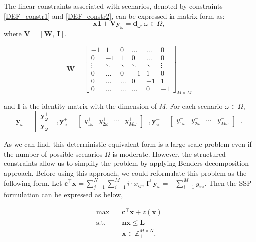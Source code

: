 The linear constraints associated with scenarios, denoted by constraints \eqref{DEF_constr1} and \eqref{DEF_constr2}, can be expressed in matrix form as:
\[\mathbf{x} \mathbf{1} + \mathbf{V} \mathbf{y}_\omega = \mathbf{d}_\omega, \omega\in \Omega,\]
where $\mathbf{V} = [\mathbf{W}, ~\mathbf{I}]$.

$$
\mathbf{W}=\left[\begin{array}{cccccc}
-1 & 1 & 0 & \ldots & \ldots & 0 \\
0 & -1 & 1 &    0   & \ldots & 0 \\
\vdots & \ddots & \ddots & \ddots & \ddots & \vdots \\
0  & \ldots   &  0  & -1 & 1 & 0 \\
0  & \ldots   &  \ldots  &  0 &  -1 & 1 \\
0 & \ldots & \ldots & \ldots & 0 & -1
\end{array}\right]_{M \times M}
$$

and $\mathbf{I}$ is the identity matrix with the dimension of $M$. For each scenario $\omega \in \Omega$,
$$
\mathbf{y}_{\omega}=\left[\begin{array}{l}
\mathbf{y}_{\omega}^{+} \\
\mathbf{y}_{\omega}^{-}
\end{array}\right], \mathbf{y}_{\omega}^{+}=\left[\begin{array}{lllll}y_{1 \omega}^{+} & y_{2 \omega}^{+} & \cdots & y_{M \omega}^{+}\end{array}\right]^{\intercal}, \mathbf{y}_{\omega}^{-}=\left[\begin{array}{llll}y_{1 \omega}^{-} & y_{2 \omega}^{-} & \cdots & y_{M \omega}^{-}\end{array}\right]^{\intercal}.
$$

As we can find, this deterministic equivalent form is a large-scale problem even if the number of possible scenarios $\Omega$ is moderate. However, the structured constraints allow us to simplify the problem by applying Benders decomposition approach. Before using this approach, we could reformulate this problem as the following form. Let $\mathbf{c}^{\intercal}\mathbf{x} = \sum_{j =1}^{N} \sum_{i=1}^M i \cdot x_{ij}$, $\mathbf{f}^{\intercal}\mathbf{y}_{\omega} = -\sum_{i=1}^{M} y_{i \omega}^{+}$. Then the SSP formulation can be expressed as below,

\begin{equation}\label{BD_master}
\begin{aligned}
\max \quad & \mathbf{c}^{\intercal} \mathbf{x}+ z(\mathbf{x}) \\
\text {s.t.} \quad & \mathbf{n} \mathbf{x} \leq \mathbf{L} \\
& \mathbf{x} \in \mathbb{Z}_{+}^{M \times N},
\end{aligned}
\end{equation}

